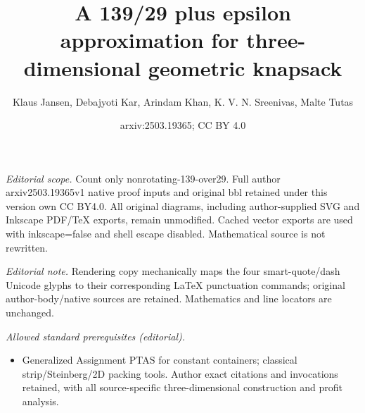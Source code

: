 \documentclass[10pt,a4paper]{amsart}
\title{A 139/29 plus epsilon approximation for three-dimensional geometric knapsack}
\author{Klaus Jansen, Debajyoti Kar, Arindam Khan, K. V. N. Sreenivas, Malte Tutas}
\date{arxiv:2503.19365; CC BY 4.0}
\theoremstyle{definition}
\begin{document}
\maketitle
\noindent\textit{Editorial scope.} Count only nonrotating-139-over29. Full author arxiv2503.19365v1 native proof inputs and original bbl retained under this version own CC BY4.0. All original diagrams, including author-supplied SVG and Inkscape PDF/TeX exports, remain unmodified. Cached vector exports are used with inkscape=false and shell escape disabled. Mathematical source is not rewritten.\par\medskip
\noindent\textit{Editorial note.} Rendering copy mechanically maps the four smart-quote/dash Unicode glyphs to their corresponding LaTeX punctuation commands; original author-body/native sources are retained. Mathematics and line locators are unchanged.\par\medskip
\noindent\textit{Allowed standard prerequisites (editorial).}\begin{itemize}
\item Generalized Assignment PTAS for constant containers; classical strip/Steinberg/2D packing tools. Author exact citations and invocations retained, with all source-specific three-dimensional construction and profit analysis.
\end{itemize}\medskip
\usetikzlibrary{patterns}
\usetikzlibrary{decorations,arrows}
\usetikzlibrary{decorations.pathmorphing}
\usetikzlibrary{decorations.text}





\end{document}
